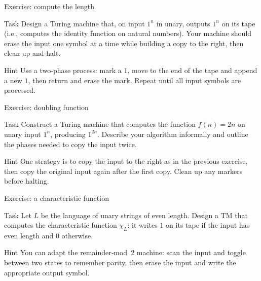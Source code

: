 \begin{frame}[t]{Exercise: compute the length}
  \begin{tblock}{Task}
    Design a Turing machine that, on input $1^n$ in unary, outputs
    $1^n$ on its tape (i.e., computes the identity function on natural
    numbers).  Your machine should erase the input one symbol at a
    time while building a copy to the right, then clean up and halt.
  \end{tblock}
  \begin{talert}{Hint}
    Use a two‑phase process: mark a $1$, move to the end of the tape
    and append a new $1$, then return and erase the mark.  Repeat until
    all input symbols are processed.
  \end{talert}
  \label{fr:7.3-11}
\end{frame}

\begin{frame}[t]{Exercise: doubling function}
  \begin{tblock}{Task}
    Construct a Turing machine that computes the function $f(n)=2n$ on
    unary input $1^n$, producing $1^{2n}$.  Describe your algorithm
    informally and outline the phases needed to copy the input twice.
  \end{tblock}
  \begin{talert}{Hint}
    One strategy is to copy the input to the right as in the previous
    exercise, then copy the original input again after the first copy.
    Clean up any markers before halting.
  \end{talert}
  \label{fr:7.3-12}
\end{frame}

\begin{frame}[t]{Exercise: a characteristic function}
  \begin{tblock}{Task}
    Let $L$ be the language of unary strings of even length.  Design a
    TM that computes the characteristic function $\chi_L$: it writes
    $1$ on its tape if the input has even length and $0$ otherwise.
  \end{tblock}
  \begin{talert}{Hint}
    You can adapt the remainder‑mod 2 machine: scan the input and
    toggle between two states to remember parity, then erase the input
    and write the appropriate output symbol.
  \end{talert}
  \label{fr:7.3-13}
\end{frame}

